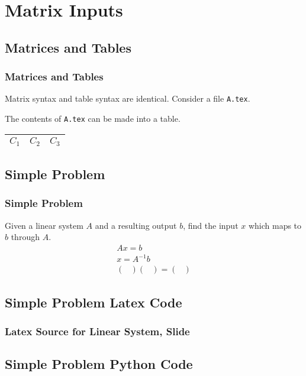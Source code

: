 \section{Matrix Inputs}
\frame{\tableofcontents[currentsection]}

\subsection{Matrices and Tables}
\begin{frame}[fragile]
\label{slide/matricesandtables}
\frametitle{Matrices and Tables}
Matrix syntax and table syntax are identical.
Consider a file \verb|A.tex|.
\begin{center}
\begin{minipage}{.45\linewidth}

\end{minipage}
\end{center}
The contents of \verb|A.tex| can be 
made into a table. \\[1em]
\begin{minipage}{.45\linewidth}
\centering
\begin{tabular}{c c c}
$C_1$ & $C_2$ & $C_3$ \\
\midrule

\end{tabular}
\end{minipage}
\begin{minipage}{.45\linewidth}
\end{minipage}
\end{frame}

\subsection{Simple Problem}
\begin{frame}
\label{slide/linear_system}
\frametitle{Simple Problem}
Given a linear system $A$ and a resulting output
$b$, find the input $x$ which maps to $b$
through $A$.
\begin{gather}
A x = b \\
x = A^{-1} b \\[2em]
\begin{pmatrix}\end{pmatrix}
\begin{pmatrix}\end{pmatrix}
= 
\begin{pmatrix}\end{pmatrix}
\end{gather}
\end{frame}

\subsection{Simple Problem Latex Code}
\begin{frame}
\frametitle{Latex Source for Linear System, 
Slide \pageref{slide/linear_system}}
\end{frame}

\subsection{Simple Problem Python Code}
\begin{frame}
\end{frame}

